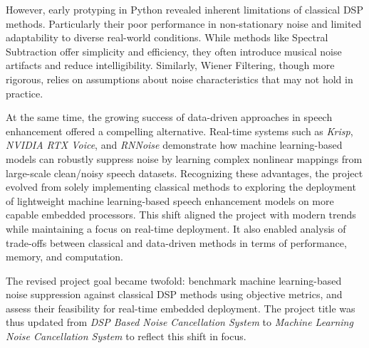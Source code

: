 However, early protyping in Python revealed inherent limitations of classical DSP methods. Particularly their poor performance in non-stationary noise and limited adaptability to diverse real-world conditions. While methods like Spectral Subtraction offer simplicity and efficiency, they often introduce musical noise artifacts and reduce intelligibility. Similarly, Wiener Filtering, though more rigorous, relies on assumptions about noise characteristics that may not hold in practice.


At the same time, the growing success of data-driven approaches in speech enhancement offered a compelling alternative. Real-time systems such as \textit{Krisp}, \textit{NVIDIA RTX Voice}, and \textit{RNNoise} demonstrate how machine learning-based models can robustly suppress noise by learning complex nonlinear mappings from large-scale clean/noisy speech datasets. Recognizing these advantages, the project evolved from solely implementing classical methods to exploring the deployment of lightweight machine learning-based speech enhancement models on more capable embedded processors. This shift aligned the project with modern trends while maintaining a focus on real-time deployment. It also enabled analysis of trade-offs between classical and data-driven methods in terms of performance, memory, and computation.

The revised project goal became twofold: benchmark machine learning-based noise suppression against classical DSP methods using objective metrics, and assess their feasibility for real-time embedded deployment. The project title was thus updated from \textit{DSP Based Noise Cancellation System} to \textit{Machine Learning Noise Cancellation System} to reflect this shift in focus.